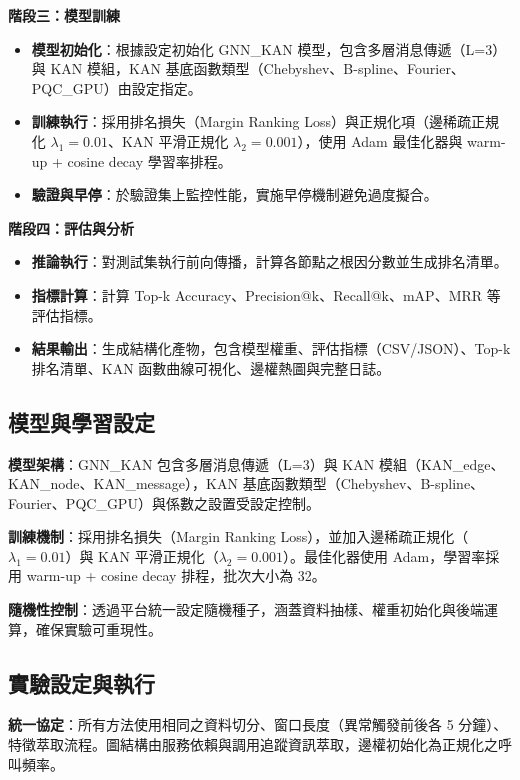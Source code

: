 \documentclass[10pt,a4paper,twocolumn]{article}
\begin{document}
\textbf{階段三：模型訓練}
\begin{itemize}
\item \textbf{模型初始化}：根據設定初始化 GNN\_KAN 模型，包含多層消息傳遞（L=3）與 KAN 模組，KAN 基底函數類型（Chebyshev、B-spline、Fourier、PQC\_GPU）由設定指定。
\item \textbf{訓練執行}：採用排名損失（Margin Ranking Loss）與正規化項（邊稀疏正規化 $\lambda_1=0.01$、KAN 平滑正規化 $\lambda_2=0.001$），使用 Adam 最佳化器與 warm-up + cosine decay 學習率排程。
\item \textbf{驗證與早停}：於驗證集上監控性能，實施早停機制避免過度擬合。
\end{itemize}

\textbf{階段四：評估與分析}
\begin{itemize}
\item \textbf{推論執行}：對測試集執行前向傳播，計算各節點之根因分數並生成排名清單。
\item \textbf{指標計算}：計算 Top-k Accuracy、Precision@k、Recall@k、mAP、MRR 等評估指標。
\item \textbf{結果輸出}：生成結構化產物，包含模型權重、評估指標（CSV/JSON）、Top-k 排名清單、KAN 函數曲線可視化、邊權熱圖與完整日誌。
\end{itemize}

\subsection{模型與學習設定}

\textbf{模型架構}：GNN\_KAN 包含多層消息傳遞（L=3）與 KAN 模組（KAN\_edge、KAN\_node、KAN\_message），KAN 基底函數類型（Chebyshev、B-spline、Fourier、PQC\_GPU）與係數之設置受設定控制。

\textbf{訓練機制}：採用排名損失（Margin Ranking Loss），並加入邊稀疏正規化（$\lambda_1=0.01$）與 KAN 平滑正規化（$\lambda_2=0.001$）。最佳化器使用 Adam，學習率採用 warm-up + cosine decay 排程，批次大小為 32。

\textbf{隨機性控制}：透過平台統一設定隨機種子，涵蓋資料抽樣、權重初始化與後端運算，確保實驗可重現性。

\subsection{實驗設定與執行}

\textbf{統一協定}：所有方法使用相同之資料切分、窗口長度（異常觸發前後各 5 分鐘）、特徵萃取流程。圖結構由服務依賴與調用追蹤資訊萃取，邊權初始化為正規化之呼叫頻率。
\end{document}
